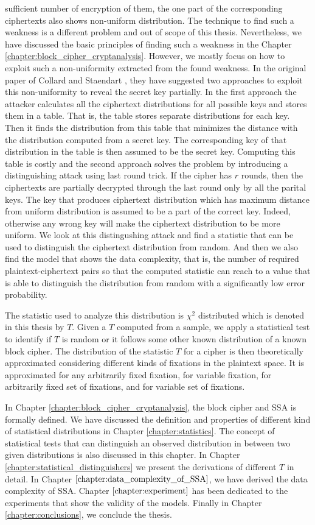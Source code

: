 sufficient number of encryption of them, the one part of the corresponding ciphertexts also shows non-uniform distribution. The technique to find such a weakness is a different problem and out of scope of this thesis. Nevertheless, we have discussed the basic principles of finding such a weakness in the Chapter \ref{chapter:block_cipher_cryptanalysis}. However, we mostly focus on how to exploit such a non-uniformity extracted from the found weakness. In the original paper of Collard and Staendart \cite{SSA_Collard_Standaert}, they have suggested two approaches to exploit this non-uniformity to reveal the secret key partially. In the first approach the attacker calculates all the ciphertext distributions for all possible keys and stores them in a table. That is, the table stores separate distributions for each key. Then it finds the distribution from this table that minimizes the distance with the distribution computed from a secret key. The corresponding key of that distribution in the table is then assumed to be the secret key. Computing this table is costly and the second approach solves the problem by introducing a distinguishing attack using last round trick. If the cipher has $r$ rounds, then the ciphertexts are partially decrypted through the last round only by all the parital keys. The key that produces ciphertext distribution which has maximum distance from uniform distribution is assumed to be a part of the correct key. Indeed, otherwise any wrong key will make the ciphertext distribution to be more uniform. We look at this distingushing attack and find a statistic that can be used to distinguish the ciphertext distribution from random. And then we also find the model that shows the data complexity, that is, the number of required plaintext-ciphertext pairs so that the computed statistic can reach to a value that is able to distinguish the distribution from random with a significantly low error probability.\par \noindent The statistic used to analyze this distribution is $\chi^2$ distributed which is denoted in this thesis by $T$. Given a $T$ computed from a sample, we apply a statistical test to identify if $T$ is random or it follows some other known distribution of a known block cipher. The distribution of the statistic $T$ for a cipher is then theoretically approximated considering different kinds of fixations in the plaintext space. It is approximated for any arbitrarily fixed fixation, for variable fixation, for arbitrarily fixed set of fixations, and for variable set of fixations.\par \noindent In Chapter \ref{chapter:block_cipher_cryptanalysis}, the block cipher and SSA is formally defined. We have discussed the definition and properties of different kind of statistical distributions in Chapter \ref{chapter:statistics}. The concept of statistical tests that can distinguish an observed distribution in between two given distributions is also discussed in this chapter. In Chapter \ref{chapter:statistical_distinguishers} we present the derivations of different $T$ in detail. In Chapter $\ref{chapter:data_complexity_of_SSA}$, we have derived the data complexity of SSA. Chapter $\ref{chapter:experiment}$ has been dedicated to the experiments that show the validity of the models. Finally in Chapter \ref{chapter:conclusions}, we conclude the thesis.